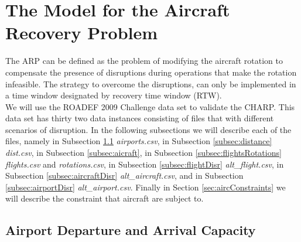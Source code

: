 \documentclass[ijoo,nonblindrev]{informs-ijoo}
\begin{document}
\section{The Model for the Aircraft Recovery Problem}\label{sec:modelARP}
The ARP can be defined as the problem of modifying the aircraft rotation to compensate the presence of disruptions during operations that make the rotation infeasible. The strategy to overcome the disruptions, can only be implemented in a time window designated by recovery time window (RTW).\\
	 We will use the ROADEF 2009 Challenge data set to validate the CHARP. This data set has thirty two data instances consisting of files that with different scenarios of disruption. In the following subsections we will describe each of the files, namely in Subsection  \ref{subsec:airports} \textit{airports.csv}, in Subsection \ref{subsec:distance} \textit{dist.csv}, in Subsection \ref{subsec:aicraft}, in Subsection \ref{subsec:flightsRotations} \textit{flights.csv} and \textit{rotations.csv}, in Subsection \ref{subsec:flightDisr} \textit{alt\_flight.csv}, in Subsection \ref{subsec:aircraftDisr} \textit{alt\_aircraft.csv}, and in Subsection \ref{subsec:airportDisr} \textit{alt\_airport.csv}. Finally in Section \ref{sec:aircConstraints} we will describe the constraint that aircraft are subject to.
	 




\subsection{Airport Departure and Arrival Capacity} \label{subsec:airports}
\end{document}
